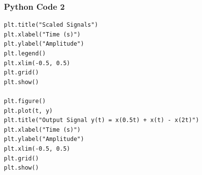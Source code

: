 \documentclass{beamer}
\begin{document}
\begin{frame}[fragile]
    \frametitle{Python Code 2}
    \begin{lstlisting}
plt.title("Scaled Signals")
plt.xlabel("Time (s)")
plt.ylabel("Amplitude")
plt.legend()
plt.xlim(-0.5, 0.5)
plt.grid()
plt.show()

plt.figure()
plt.plot(t, y)
plt.title("Output Signal y(t) = x(0.5t) + x(t) - x(2t)")
plt.xlabel("Time (s)")
plt.ylabel("Amplitude")
plt.xlim(-0.5, 0.5)
plt.grid()
plt.show()
    \end{lstlisting}
\end{frame}
\end{document}
